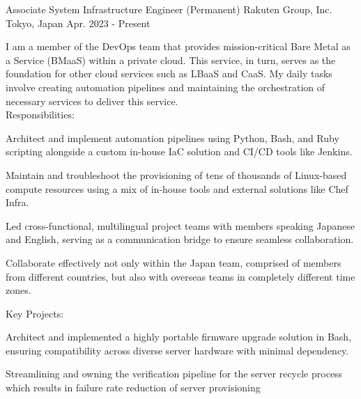 

\begin{cventries}

  \cventry
    {Associate System Infrastructure Engineer (Permanent)} %
    {Rakuten Group, Inc.} %
    {Tokyo, Japan} %
    {Apr. 2023 - Present} %
    {
      \begin{cvjobdesc} %
        I am a member of the DevOps team that provides mission-critical Bare Metal as a Service (BMaaS) within a private cloud. This service, in turn, serves as the foundation for other cloud services such as LBaaS and CaaS. My daily tasks involve creating automation pipelines and maintaining the orchestration of necessary services to deliver this service.
        \vspace{2.0mm}
        \\Responsibilities:
        \begin{cvbullets}
        \item {Architect and implement automation pipelines using Python, Bash, and Ruby scripting alongside a custom in-house IaC solution and CI/CD tools like Jenkins.}
        \item {Maintain and troubleshoot the provisioning of tens of thousands of Linux-based compute resources using a mix of in-house tools and external solutions like Chef Infra.}
        \item {Led cross-functional, multilingual project teams with members speaking Japanese and English, serving as a communication bridge to ensure seamless collaboration.}
        \item {Collaborate effectively not only within the Japan team, comprised of members from different countries, but also with overseas teams in completely different time zones.}
        \end{cvbullets}
        \vspace{2.0mm}
        Key Projects:
        \begin{cvbullets}
        \item {Architect and implemented a highly portable firmware upgrade solution in Bash, ensuring compatibility across diverse server hardware with minimal dependency.}
        \item {Streamlining and owning the verification pipeline for the server recycle process which results in failure rate reduction of server provisioning}
        \end{cvbullets}
      \end{cvjobdesc}
    }


\end{cventries}
